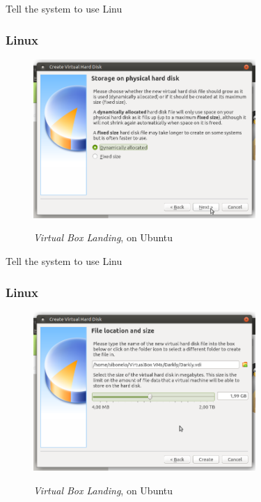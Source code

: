 Tell the system to use Linu
\subsubsection{Linux}

\begin{figure}[!htb]
    \centering
    \includegraphics[width=0.752\textwidth]{images/00-04.png}\\[0cm]  
    \caption[Virtual Box]{\emph{Virtual Box Landing}, on Ubuntu}
    \label{fig:00-04 - Linux Virtual Box Landing} 
\end{figure}

Tell the system to use Linu
\subsubsection{Linux}

\begin{figure}[!htb]
    \centering
    \includegraphics[width=0.752\textwidth]{images/00-05.png}\\[0cm]  
    \caption[Virtual Box]{\emph{Virtual Box Landing}, on Ubuntu}
    \label{fig:00-05 - Linux Virtual Box Landing} 
\end{figure}

